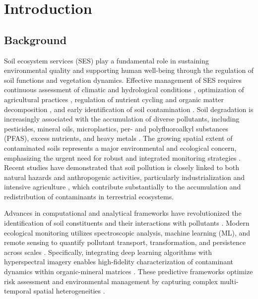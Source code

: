 \documentclass[environments,article,submit,pdftex,moreauthors]{Definitions/mdpi}
\begin{document}
\section{Introduction}\label{sec1}

\subsection{Background}\label{sec1.1}

Soil ecosystem services (SES) play a fundamental role in sustaining
environmental quality and supporting human well-being through the regulation
of soil functions and vegetation dynamics. Effective management of SES
requires continuous assessment of climatic and hydrological conditions
\cite{Lal2020,Robinson2014}, optimization of agricultural practices
\cite{Hepperly2009}, regulation of nutrient cycling and organic
matter decomposition \cite{Atoloye2024,Ma2024,Vishwanath2025}, and early
identification of soil contamination
\cite{Pan2019,Lemenkova2025b,Proshad2025}. Soil degradation is
increasingly associated with the accumulation of diverse pollutants,
including pesticides, mineral oils, microplastics, per- and polyfluoroalkyl
substances (PFAS), excess nutrients, and heavy metals
\cite{Shen2024,Guan2024,Baghaie2020,Luo2017}. The growing spatial extent of
contaminated soils represents a major environmental and ecological concern,
emphasizing the urgent need for robust and integrated monitoring strategies
\cite{Liu2020,Lemenkova2025d}. Recent studies have demonstrated
that soil pollution is closely linked to both natural hazards and
anthropogenic activities, particularly industrialization
\cite{Rosskopfova2012,Guo2025} and intensive agriculture
\cite{Hepperly2009}, which contribute substantially to the
accumulation and redistribution of contaminants in terrestrial ecosystems.

Advances in computational and analytical frameworks have revolutionized the
identification of soil constituents and their interactions with pollutants
\cite{Liu2020}. Modern ecological monitoring utilizes spectroscopic
analysis, machine learning (ML), and remote sensing to quantify pollutant
transport, transformation, and persistence across scales
\cite{Padarian}. Specifically, integrating deep learning
algorithms with hyperspectral imagery enables high-fidelity characterization
of contaminant dynamics within organic-mineral matrices \cite{Xu2026}.
These predictive frameworks optimize risk assessment and environmental
management by capturing complex multi-temporal spatial heterogeneities
\cite{Proshad2025}.
\end{document}
